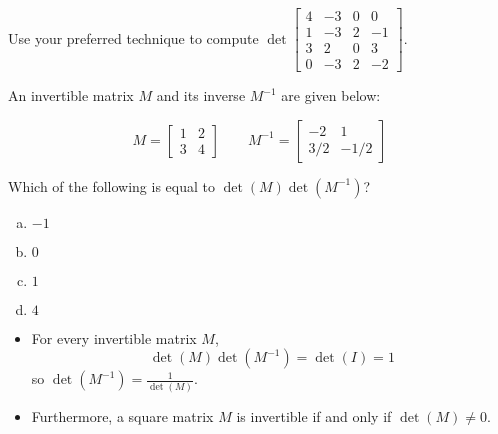 \begin{activity}{10}
  Use your preferred technique to compute 
  \(
    \det\begin{bmatrix} 
      4 & -3 & 0 & 0 \\ 
      1 & -3 & 2 & -1 \\ 
      3 & 2 & 0 & 3 \\ 
      0 & -3 & 2 & -2 
    \end{bmatrix}
  \).
\end{activity}

\begin{activity}{5}
  An invertible matrix \(M\) and its inverse \(M^{-1}\) are given below:
 
  \[
    M=\begin{bmatrix}1&2\\3&4\end{bmatrix}
  \hspace{2em}
    M^{-1}=\begin{bmatrix}-2&1\\3/2&-1/2\end{bmatrix}
  \]

\vspace{1em}

  Which of the following is equal to \(\det(M)\det(M^{-1})\)?

\begin{enumerate}[a)]
\item \(-1\)
\item \(0\)
\item \(1\)
\item \(4\)
\end{enumerate}
\end{activity}

\begin{fact}
  \begin{itemize}
\item   For every invertible matrix \(M\),
  \[
    \det(M)\det(M^{-1})= \det(I)=1
  \]
  so \(\det(M^{-1})=\frac{1}{\det(M)}\).

\item  Furthermore,
  a square matrix \(M\) is invertible if and only if \(\det(M)\not=0\).
  \end{itemize}
\end{fact}


